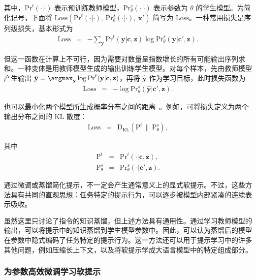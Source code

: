 \noindent 其中，$\mathrm{Pr}^{t}(\cdot|\cdot)$ 表示预训练教师模型，$\mathrm{Pr}_{\theta}^{s}(\cdot|\cdot)$ 表示参数为 $\theta$ 的学生模型。为简化记号，下面将 $\mathrm{Loss}(\mathrm{Pr}^{t}(\cdot|\cdot),\ \mathrm{Pr}_{\theta}^{s}(\cdot|\cdot),\ \mathbf{x}')$ 简写为 $\mathrm{Loss}$。一种常用损失是序列级损失，基本形式为
\begin{eqnarray}
\mathrm{Loss} & = & -\sum_{\mathbf{y}} \mathrm{Pr}^{t}(\mathbf{y}|\mathbf{c},\mathbf{z}) \log \mathrm{Pr}_{\theta}^{s}(\mathbf{y}|\mathbf{c}',\mathbf{z}).
\end{eqnarray}

但这一函数在计算上不可行，因为需要对数量呈指数增长的所有可能输出序列求和。一种变体是用教师模型生成的输出训练学生模型。对每个样本，先由教师模型产生输出 $\hat{\mathbf{y}} = \argmax_{\mathbf{y}} \log \mathrm{Pr}^{t}(\mathbf{y}|\mathbf{c},\mathbf{z})$，再将 $\hat{\mathbf{y}}$ 作为学习目标，此时损失函数为
\begin{eqnarray}
\mathrm{Loss} & = & -\log \mathrm{Pr}_{\theta}^{s}(\hat{\mathbf{y}}|\mathbf{c}', \mathbf{z}). \label{eq:context-distillation-simple}
\end{eqnarray}

也可以最小化两个模型所生成概率分布之间的距离~\cite{askell-etal:2021general}。例如，可将损失定义为两个输出分布之间的 KL 散度：
\begin{eqnarray}
\mathrm{Loss} & = & \mathrm{D}_{\mathrm{KL}}(\mathrm{P}^{t} \,\|\, \mathrm{P}_{\theta}^{s}), \label{eq:context-distillation-kl}
\end{eqnarray}

\noindent 其中
\begin{eqnarray}
\mathrm{P}^t & = & \mathrm{Pr}^{t}(\cdot|\mathbf{c},\mathbf{z}), \\
\mathrm{P}^s_{\theta} & = & \mathrm{Pr}_{\theta}^{s}(\cdot|\mathbf{c}', \mathbf{z}).
\end{eqnarray}

通过微调或蒸馏简化提示，不一定会产生通常意义上的显式软提示。不过，这些方法具有共同的直观思想：任务特定的提示行为，可以逐步被模型内部紧凑的连续表示吸收。

虽然这里只讨论了指令的知识蒸馏，但上述方法具有通用性。通过学习教师模型的输出，可以将提示中的知识蒸馏到学生模型参数中。因此，可以认为蒸馏后的模型在参数中隐式编码了任务特定的提示行为。这一方法还可以用于提示学习中的许多其他问题，例如压缩长上下文，以及将软提示学成大语言模型中的特定组成部分。

\subsubsection{为参数高效微调学习软提示}

